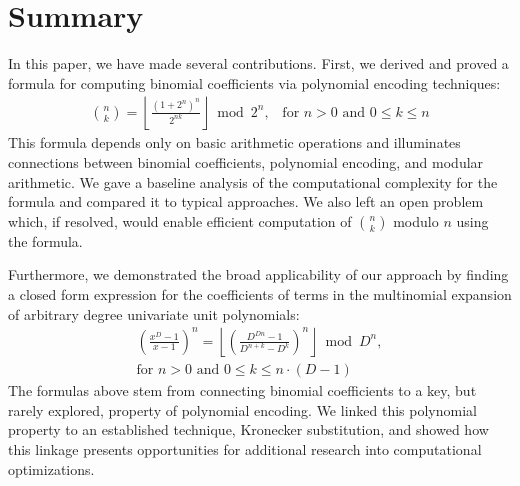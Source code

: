 \documentclass{article}
\theoremstyle{plain}
\theoremstyle{definition}
\begin{document}

\section{Summary}
In this paper, we have made several contributions. First, we derived and proved a formula for computing binomial coefficients via polynomial encoding techniques:
\begin{align*}
    \binom{n}{k} = \left\lfloor\frac{(1 + 2^{n})^{n}}{2^{n k}}\right\rfloor \bmod{2^{n}}\text{,} \quad \text{for } n > 0 \text{ and } 0 \leq k \leq n
\end{align*}
This formula depends only on basic arithmetic operations and illuminates connections between binomial coefficients, polynomial encoding, and modular arithmetic. We gave a baseline analysis of the computational complexity for the formula and compared it to typical approaches. We also left an open problem which, if resolved, would enable efficient computation of \(\binom{n}{k}\) modulo \(n\) using the formula.

Furthermore, we demonstrated the broad applicability of our approach by finding a closed form expression for the coefficients of terms in the multinomial expansion of arbitrary degree univariate unit polynomials:
\begin{align*}
    [x^k] \left(\frac{x^{D}-1}{x-1}\right)^n = \left\lfloor \left(\frac{D^{Dn} - 1}{D^{n+k} - D^k}\right)^n\right\rfloor \bmod D^n, \\ \text{for } n > 0 \text{ and } 0 \leq k \leq n \cdot (D-1)
\end{align*}
The formulas above stem from connecting binomial coefficients to a key, but rarely explored, property of polynomial encoding. We linked this polynomial property to an established technique, Kronecker substitution, and showed how this linkage presents opportunities for additional research into computational optimizations.



\end{document}
